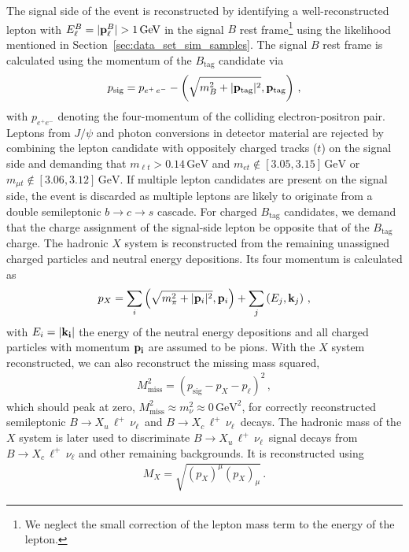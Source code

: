 \documentclass[twocolumn,aps,prd,superscriptaddress,nofootinbib,floatfix,preprintnumbers,a4]{revtex4-1}
\newcommand{\bulnu}{\ensuremath{B \to X_u \, \ell^+\, \nu_{\ell}}\xspace}
\newcommand{\bclnu}{\ensuremath{B \to X_c \, \ell^+\, \nu_{\ell}}\xspace}
\begin{document}
The signal side of the event is reconstructed by identifying a well-reconstructed lepton with \mbox{$E_\ell^B = |\bold{p}_{\ell}^B| > 1 \, \mathrm{GeV}$} in the signal $B$ rest frame\footnote{We neglect the small correction of the lepton mass term to the energy of the lepton.} using the likelihood mentioned in Section~\ref{sec:data_set_sim_samples}. The signal $B$ rest frame is calculated using the momentum of the $B_{\mathrm{tag}}$ candidate via
\begin{align}
p_{\mathrm{sig}} =  p_{e^+ \, e^-}  - \left( \sqrt{m_B^2 + |\bold{p_{\mathrm{tag}}}|^2 } , \bold{p_{\mathrm{tag}}} \right) \, ,
\end{align}
with $p_{e^+ e^-}$ denoting the four-momentum of the colliding electron-positron pair. Leptons from $J/\psi$ and photon conversions in detector material are rejected by combining the lepton candidate with oppositely charged tracks ($t$) on the signal side and demanding that $m_{\ell t} > 0.14 \, \text{GeV}$ and \mbox{$m_{e t} \notin [3.05,3.15] \, \text{GeV}$} or \mbox{$m_{\mu t} \notin [3.06,3.12] \, \text{GeV}$}. If multiple lepton candidates are present on the signal side, the event is discarded as multiple leptons are likely to originate from a double semileptonic $b \to c \to s$ cascade. For charged  $B_{\mathrm{tag}}$ candidates, we demand that the charge assignment of the signal-side lepton be opposite that of the $B_{\mathrm{tag}}$ charge. The hadronic $X$ system is reconstructed from the remaining unassigned charged particles and neutral energy depositions. Its four momentum is calculated as
\begin{align}
  p_X = \sum_i \left( \sqrt{m_\pi^2 + |\bold{p}_i|^2 } , \bold{p}_i \right) + \sum_j \left( E_j , \bold{k}_j \right)  \, ,
\end{align}
with $E_i = |\bold{k_i}|$ the energy of the neutral energy depositions and all charged particles with momentum $\bold{p_i}$ are assumed to be pions. With the $X$ system reconstructed, we can also reconstruct the missing mass squared,
\begin{align}
 M_{\mathrm{miss}}^2 = \left(p_{\mathrm{sig}} - p_X - p_\ell  \right)^2 \, ,
\end{align}
which should peak at zero, $ M_{\mathrm{miss}}^2 \approx m_\nu^2 \approx 0\, \text{GeV}^2$, for correctly reconstructed semileptonic \bulnu\ and \bclnu\ decays. The hadronic mass of the $X$ system is later used to discriminate \bulnu\ signal decays from \bclnu and other remaining backgrounds. It is reconstructed using 
\begin{align}
 M_X = \sqrt{ \left( p_X \right)^\mu \left( p_X \right)_\mu } \, .
\end{align} 
\end{document}
